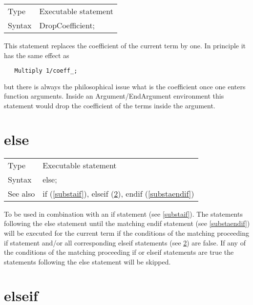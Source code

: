 \noindent \begin{tabular}{ll}
Type & Executable statement\\
Syntax & DropCoefficient;
\end{tabular} \vspace{4mm}

\noindent This statement replaces the coefficient of the current term by 
one. In principle it has the same effect as
\begin{verbatim}
   Multiply 1/coeff_;
\end{verbatim}
but there is always the philosophical issue what is the coefficient once 
one enters function arguments. Inside an 
Argument/EndArgument environment this 
statement would drop the coefficient of the terms inside the argument.
\vspace{10mm}


\section{else}
\label{substaelse}

\noindent \begin{tabular}{ll}
Type & Executable statement\\
Syntax & else;
\\ See also & if (\ref{substaif}),
              elseif (\ref{substaelseif}),
              endif (\ref{substaendif})
\end{tabular} \vspace{4mm}

\noindent To be used in combination with an if statement (see 
\ref{substaif}). The statements following the
else statement until the matching 
endif 
statement (see \ref{substaendif}) will be executed for the current term if 
the conditions of the matching proceeding if 
statement and/or all corresponding elseif statements (see 
\ref{substaelseif}) are false. If any of the conditions of the matching 
proceeding if or elseif statements are true the statements following the 
else statement will be skipped. \vspace{10mm}

 
\section{elseif}
\label{substaelseif}

